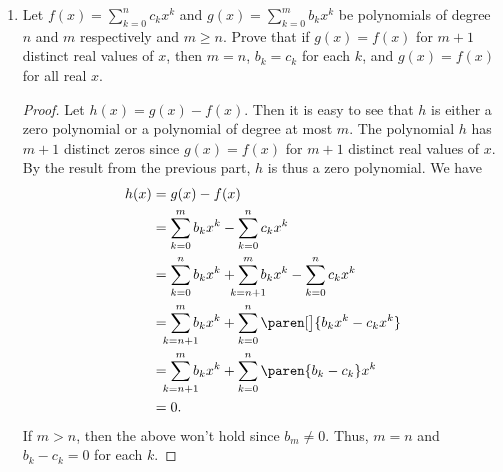 \documentclass[a4paper]{article}
\begin{document}
\begin{enumerate}
\begin{enumerate}
    \begin{proof}
      Suppose the degree of the polynomial \(f\) is well-defined.  Then let
      \(m\) denote the degree of \(f\).  By the result from Recitation~5, we
      have
      \begin{align*}
        f(x) &= h_0(x) \\
             &= (x-x_0) \, h_1(x) \\
             &= (x-x_0)(x-x_1) \, h_2(x) \\
             &= \brce[\bigg]{\prod_{k=0}^{m-1} (x-x_k)} \, h_m(x),
      \end{align*}
      where each \(h_i\) is a polynomial of degree \(m-i\).  Since
      \(0 \le m \le n\) and \(f\) has \(n+1\) distinct zeros, there is at
      least one \(x_m\) different from \(x_0, x_1, \dotsc, x_{m-1}\) such
      that
      \[
        f(x_m) = \brce[\bigg]{\prod_{k=0}^{m-1} (x_m-x_k)} \, h_m(x_m) = 0.
      \]
      The product in the braces is not zero, then by Theorem~I.11
      \(h_m(x_m) = 0\).  This is impossible since \(h_m\) is of degree
      \(0\).  Thus, \(f\) must be a zero polynomial.
    \end{proof}

  \item Let \(f(x) = \sum_{k=0}^n c_k x^k\) and
    \(g(x) = \sum_{k=0}^m b_k x^k\) be polynomials of degree \(n\) and \(m\)
    respectively and \(m \ge n\).  Prove that if \(g(x) = f(x)\) for \(m+1\)
    distinct real values of \(x\), then \(m = n\), \(b_k = c_k\) for each
    \(k\), and \(g(x) = f(x)\) for all real \(x\).

    \begin{proof}
      Let \(h(x) = g(x) - f(x)\).  Then it is easy to see that \(h\) is
      either a zero polynomial or a polynomial of degree at most \(m\).  The
      polynomial \(h\) has \(m+1\) distinct zeros since \(g(x) = f(x)\) for
      \(m+1\) distinct real values of \(x\).  By the result from the
      previous part, \(h\) is thus a zero polynomial.  We have
      \begin{align*}
        h(x) &= g(x) - f(x) \\
             &= \sum_{k=0}^m b_k x^k - \sum_{k=0}^n c_k x^k \\
             &= \sum_{k=0}^n b_k x^k + \sum_{\mathclap{k=n+1}}^m b_k x^k - \sum_{k=0}^n c_k x^k \\
             &= \sum_{\mathclap{k=n+1}}^m b_k x^k + \sum_{k=0}^n \paren[\big]{b_k x^k - c_k x^k} \\
             &= \sum_{\mathclap{k=n+1}}^m b_k x^k + \sum_{k=0}^n \paren{b_k - c_k} x^k \\
             &= 0.
      \end{align*}
      If \(m > n\), then the above won't hold since \(b_m \ne 0\).  Thus,
      \(m = n\) and \(b_k - c_k = 0\) for each \(k\).
    \end{proof}
  \end{enumerate}


\end{enumerate}
\end{document}
